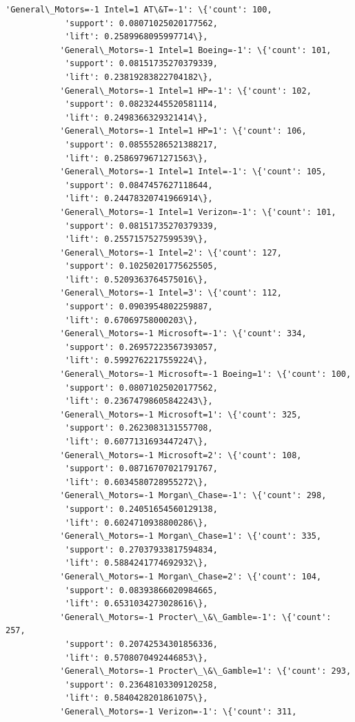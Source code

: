 \documentclass[11pt]{article}
\begin{document}
\begin{Verbatim}[commandchars=\\\{\}]
           'General\_Motors=-1 Intel=1 AT\&T=-1': \{'count': 100,
            'support': 0.08071025020177562,
            'lift': 0.2589968095997714\},
           'General\_Motors=-1 Intel=1 Boeing=-1': \{'count': 101,
            'support': 0.08151735270379339,
            'lift': 0.23819283822704182\},
           'General\_Motors=-1 Intel=1 HP=-1': \{'count': 102,
            'support': 0.08232445520581114,
            'lift': 0.2498366329321414\},
           'General\_Motors=-1 Intel=1 HP=1': \{'count': 106,
            'support': 0.08555286521388217,
            'lift': 0.2586979671271563\},
           'General\_Motors=-1 Intel=1 Intel=-1': \{'count': 105,
            'support': 0.0847457627118644,
            'lift': 0.24478320741966914\},
           'General\_Motors=-1 Intel=1 Verizon=-1': \{'count': 101,
            'support': 0.08151735270379339,
            'lift': 0.2557157527599539\},
           'General\_Motors=-1 Intel=2': \{'count': 127,
            'support': 0.10250201775625505,
            'lift': 0.5209363764575016\},
           'General\_Motors=-1 Intel=3': \{'count': 112,
            'support': 0.0903954802259887,
            'lift': 0.67069758000203\},
           'General\_Motors=-1 Microsoft=-1': \{'count': 334,
            'support': 0.26957223567393057,
            'lift': 0.5992762217559224\},
           'General\_Motors=-1 Microsoft=-1 Boeing=1': \{'count': 100,
            'support': 0.08071025020177562,
            'lift': 0.23674798605842243\},
           'General\_Motors=-1 Microsoft=1': \{'count': 325,
            'support': 0.2623083131557708,
            'lift': 0.6077131693447247\},
           'General\_Motors=-1 Microsoft=2': \{'count': 108,
            'support': 0.08716707021791767,
            'lift': 0.6034580728955272\},
           'General\_Motors=-1 Morgan\_Chase=-1': \{'count': 298,
            'support': 0.24051654560129138,
            'lift': 0.6024710938800286\},
           'General\_Motors=-1 Morgan\_Chase=1': \{'count': 335,
            'support': 0.27037933817594834,
            'lift': 0.5884241774692932\},
           'General\_Motors=-1 Morgan\_Chase=2': \{'count': 104,
            'support': 0.08393866020984665,
            'lift': 0.6531034273028616\},
           'General\_Motors=-1 Procter\_\&\_Gamble=-1': \{'count': 257,
            'support': 0.20742534301856336,
            'lift': 0.5708070492446853\},
           'General\_Motors=-1 Procter\_\&\_Gamble=1': \{'count': 293,
            'support': 0.23648103309120258,
            'lift': 0.5840428201861075\},
           'General\_Motors=-1 Verizon=-1': \{'count': 311,

\end{Verbatim}
\end{document}
